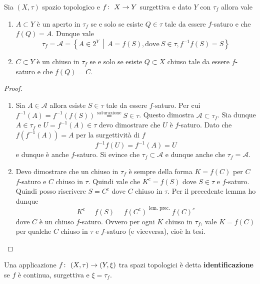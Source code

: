 \begin{theorem}
	Sia $(X, \tau)$ spazio topologico e $f \colon\ X \rightarrow Y$ surgettiva e dato $Y$ con $\tau_f$ allora vale 
	\begin{enumerate}
		\item $A \subset Y$ è un aperto in $\tau_f$ se e solo se esiste $Q \in \tau$ tale da essere $f$-saturo e che $f(Q) = A$. Dunque vale 
		\begin{equation*}
			\tau_f = \mathcal{A} = \left\{ A \in 2^Y \,\middle|\, A = f(S), \text{dove}\ S \in \tau, f^{-1}f(S) = S\right\}
		\end{equation*}
		\item $C \subset Y$ è un chiuso in $\tau_f$ se e solo se esiste $Q \subset X$ chiuso tale da essere $f$-saturo e che $f(Q) = C$.
	\end{enumerate}
\end{theorem}
\begin{proof}
	\begin{enumerate}
			\item Sia $A \in \mathcal{A}$ allora esiste $S \in \tau$ tale da essere $f$-saturo. Per cui $f^{-1}(A) = f^{-1}(f(S)) \overset{\text{saturazione}}{=} S \in \tau$. Questo dimostra $\mathcal{A} \subset \tau_f$. Sia dunque $A \in \tau_f$ e $U = f^{-1}(A) \in \tau$ devo dimostrare che $U$ è $f$-saturo. 
			Dato che $f(f^{-1}(A)) = A$ per la surgettività di $f$   
			\begin{equation*}
				f^{-1}f(U) = f^{-1}(A) = U
			\end{equation*} 
			e dunque è anche $f$-saturo. Si evince che $\tau_f \subset \mathcal{A}$ e dunque anche che $\tau_f = \mathcal{A}$.
		\item Devo dimostrare che un chiuso in $\tau_f$ è sempre della forma $K = f(C)$ per $C$ $f$-saturo e $C$ chiuso in $\tau$. Quindi vale che $K^c = f(S)$ dove $S \in \tau$ e $f$-saturo. Quindi posso riscrivere $S = C^c$ dove $C$ chiuso in $\tau$. Per il precedente lemma ho dunque
		\begin{equation*}
			K^c = f(S) = f(C^c) \overset{\text{lem. prec.}}{=} f(C)^c
		\end{equation*}
		dove $C$ è un chiuso $f$-saturo. Ovvero per ogni $K$ chiuso in $\tau_f$, vale $K = f(C)$ per qualche $C$ chiuso in $\tau$ e $f$-saturo (e viceversa), cioè la tesi.
	\end{enumerate}
\end{proof}

\begin{definition}
	Una applicazione $f \colon\ (X,\tau) \rightarrow (Y, \xi)$ tra spazi topologici è detta \textbf{identificazione} se $f$ è continua, surgettiva e $\xi = \tau_f$.
\end{definition}

